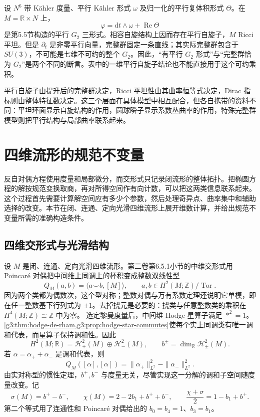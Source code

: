 \begin{example}\label{g3:exm:B-product-special-holonomy}
 设 \(N^6\) 带 Kähler 度量、平行 Kähler 形式 \(\omega\) 及归一化的平行复体积形式 \(\Theta\)。在 \(M=\mathbb R\times N\) 上，
 \[
  \varphi=\mathrm dt\wedge\omega+\operatorname{Re}\Theta
 \]
 是第5.5节构造的平行 \(G_2\) 三形式。相容自旋结构上因而存在平行自旋子，\(M\) Ricci 平坦。但是 \(\partial_t\) 是非零平行向量，完整群固定一条直线；其实际完整群包含于 \(SU(3)\)，不可能是七维不可约的整个 \(G_2\)。因此，“有平行 \(G_2\) 形式”与“完整群恰为 \(G_2\)”是两个不同的断言。表中的一维平行自旋子结论也不能直接用于这个可约乘积。
\end{example}

平行自旋子由提升后的完整群决定，Ricci 平坦性由其曲率恒等式决定，Dirac 指标则由整体特征数决定。这三个层面在具体模型中相互配合，但各自携带的资料不同：平坦环面显示自旋结构的作用，圆球瞬子显示系数丛曲率的作用，特殊完整群模型则把平行结构与局部曲率联系起来。

\section{四维流形的规范不变量}
\label{g3:sec:B04}

反自对偶方程使用度量和局部微分，而交形式只记录闭流形的整体拓扑。把椭圆方程的解按规范变换取商，再对所得空间作有向计数，可以把这两类信息联系起来。这个过程首先需要计算解空间应有多少个参数，然后处理奇异点、曲率集中和辅助选择的改变。本节在闭、连通、定向光滑四维流形上展开维数计算，并给出规范不变量所需的准确构造条件。

\subsection{四维交形式与光滑结构}
\label{g3:subsec:B04:01}

设 \(M\) 是闭、连通、定向光滑四维流形。第二卷第6.5.1小节的中维交形式用 Poincaré 对偶把中间维上同调上的杯积变成整数双线性型
\begin{equation}\label{g3:eq:B-intersection-form}
 Q_M(a,b)=\langle a\smile b,[M]\rangle,
 \qquad a,b\in H^2(M;\mathbb Z)/\operatorname{Tor}.
\end{equation}
因为两个类都为偶数次，这个型对称；整数对偶与万有系数定理还说明它单模，即在任一整数基下行列式为 \(\pm1\)。去掉挠元是必要的：挠类与任意整数类的乘积在 \(H^4(M;\mathbb Z)\cong\mathbb Z\) 中为零。
\ProseParagraphBreak
选定黎曼度量后，中间维 Hodge 星算子满足 \(*^2=1\)。\cref{g3:thm:hodge-de-rham,g3:prop:hodge-star-commutes}使每个实上同调类有唯一调和代表，而星算子保持调和性。因此
\[
 H^2(M;\mathbb R)=\mathcal H^2_+(M)\oplus\mathcal H^2_-(M),
 \qquad b^\pm=\dim_{\mathbb R}\mathcal H^2_\pm(M).
\]
若 \(\alpha=\alpha_++\alpha_-\) 是调和代表，则
\[
 Q_M([\alpha],[\alpha])
 =\|\alpha_+\|_{L^2}^2-\|\alpha_-\|_{L^2}^2.
\]
由实对称型的惯性定理，\(b^+,b^-\) 与度量无关，尽管实现这一分解的调和子空间随度量改变。记
\begin{equation}\label{g3:eq:B-four-dimensional-topology}
 \sigma(M)=b^+-b^-,\qquad
 \chi(M)=2-2b_1+b^++b^-,\qquad
 \frac{\chi+\sigma}{2}=1-b_1+b^+.
\end{equation}
第二个等式用了连通性和 Poincaré 对偶给出的 \(b_0=b_4=1\)、\(b_3=b_1\)。

